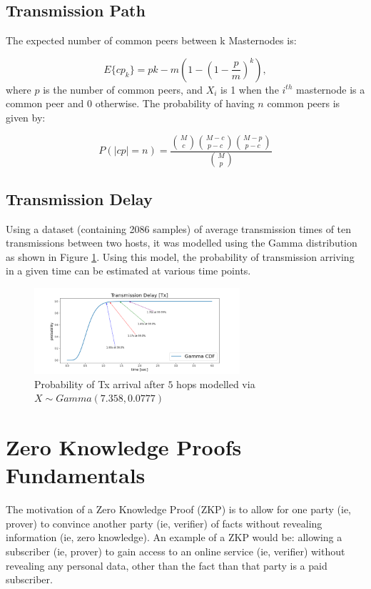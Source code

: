 \documentclass[peerreview]{ieeesyscoin}
\begin{document}
\subsection{Transmission Path}

The expected number of common peers between k Masternodes is:

\begin{equation}
E\{cp_{k}\} = pk -m \left(1 - \left(1 - \frac{p}{m}\right)^{k}\right),
\end{equation}
where $p$ is the number of common peers, and $X_{i}$ is 1 when the $i^{th}$ masternode is a common peer and 0 otherwise. The probability of having $n$ common peers is given by: 

\begin{equation}
P(|cp| = n) = \frac{\binom{M}{c} \binom{M-c}{p-c} \binom{M-p}{p-c} }{\binom{M}{p}}
\end{equation}

\subsection{Transmission Delay}

Using a dataset (containing 2086 samples) of average transmission times of ten transmissions between two hosts, it was modelled using the Gamma distribution as shown in Figure \ref{fig:tx_delay}. Using this model, the probability of transmission arriving in a given time can be estimated at various time points.

\begin{figure}[h!]
\includegraphics[width=3in]{img/transmission_delay.png}
\caption{Probability of Tx arrival after $5$ hops modelled via $X \sim Gamma(7.358,0.0777)$} 
\label{fig:tx_delay}
\end{figure} 

\section{Zero Knowledge Proofs Fundamentals}

The motivation of a Zero Knowledge Proof (ZKP) is to allow for one party (ie, prover) to convince another party (ie, verifier) of facts without revealing information (ie, zero knowledge). An example of a ZKP would be: allowing a subscriber (ie, prover) to gain access to an online service (ie, verifier) without revealing any personal data, other than the fact than that party is a paid subscriber.
\end{document}
